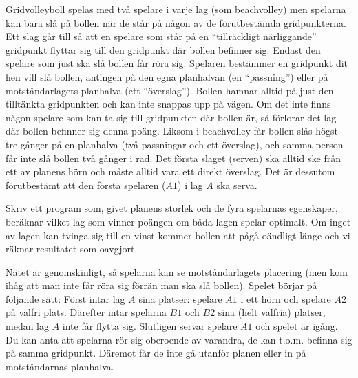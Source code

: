 Gridvolleyboll spelas med två spelare i varje lag (som beachvolley) men spelarna kan bara slå på bollen när de står på någon av de förutbestämda gridpunkterna.
Ett slag går till så att en spelare som står på en ``tillräckligt närliggande'' gridpunkt flyttar sig till den gridpunkt där bollen befinner sig.
Endast den spelare som just ska slå bollen får röra sig.
Spelaren bestämmer en gridpunkt dit hen vill slå bollen, antingen på den egna planhalvan (en ``passning'') eller på motståndarlagets planhalva (ett ``överslag'').
Bollen hamnar alltid på just den tilltänkta gridpunkten och kan inte snappas upp på vägen. 
Om det inte finns någon spelare som kan ta sig till gridpunkten där bollen är, så förlorar det lag där bollen befinner sig denna poäng.
Liksom i beachvolley får bollen slås högst tre gånger på en planhalva (två passningar och ett överslag), och samma person får inte slå bollen två gånger i rad.
Det första slaget (serven) ska alltid ske från ett av planens hörn och måste alltid vara ett direkt överslag.
Det är dessutom förutbestämt att den första spelaren ($A1$) i lag $A$ ska serva.

Skriv ett program som, givet planens storlek och de fyra spelarnas egenskaper, beräknar vilket lag som vinner poängen om båda lagen spelar optimalt.
Om inget av lagen kan tvinga sig till en vinst kommer bollen att pågå oändligt länge och vi räknar resultatet som oavgjort. 

Nätet är genomskinligt, så spelarna kan se motståndarlagets placering (men kom ihåg att man inte får röra sig förrän man ska slå bollen).
Spelet börjar på följande sätt: Först intar lag $A$ sina platser: spelare $A1$ i ett hörn och spelare $A2$ på valfri plats.
Därefter intar spelarna $B1$ och $B2$ sina (helt valfria) platser, medan lag $A$ inte får flytta sig.
Slutligen servar spelare $A1$ och spelet är igång.
Du kan anta att spelarna rör sig oberoende av varandra, de kan t.o.m. befinna sig på samma gridpunkt.
Däremot får de inte gå utanför planen eller in på motståndarnas planhalva.

